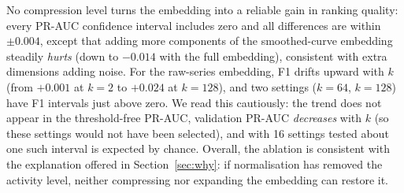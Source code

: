 No compression level turns the embedding into a reliable gain in ranking quality: every PR-AUC confidence interval includes zero and all differences are within $\pm0.004$, except that adding more components of the smoothed-curve embedding steadily \emph{hurts} (down to $-0.014$ with the full embedding), consistent with extra dimensions adding noise. For the raw-series embedding, F1 drifts upward with $k$ (from $+0.001$ at $k=2$ to $+0.024$ at $k=128$), and two settings ($k=64$, $k=128$) have F1 intervals just above zero. We read this cautiously: the trend does not appear in the threshold-free PR-AUC, validation PR-AUC \emph{decreases} with $k$ (so these settings would not have been selected), and with 16 settings tested about one such interval is expected by chance. Overall, the ablation is consistent with the explanation offered in Section~\ref{sec:why}: if normalisation has removed the activity level, neither compressing nor expanding the embedding can restore it.
